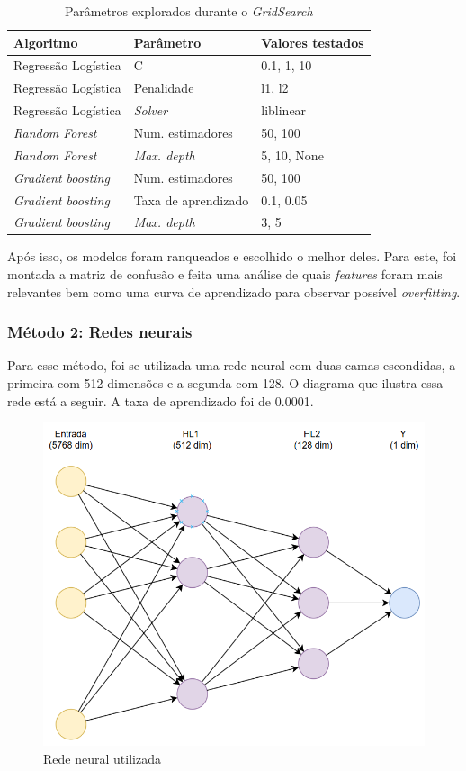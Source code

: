 \documentclass[12pt]{article}
\begin{document}
\begin{table}[H]
	\centering
	\begin{tabular}{|l|l|l|}
		\hline
		Algoritmo & Parâmetro & Valores testados \\
		\hline
		Regressão Logística & C & 0.1, 1, 10  \\
		Regressão Logística & Penalidade & l1, l2 \\ 
		Regressão Logística & \textit{Solver} & liblinear \\ 
		\hline
		\textit{Random Forest} & Num. estimadores & 50, 100 \\
		\textit{Random Forest} & \textit{Max. depth} & 5, 10, None \\
		\hline
		\textit{Gradient boosting} & Num. estimadores & 50, 100\\
		\textit{Gradient boosting} & Taxa de aprendizado & 0.1, 0.05\\
		\textit{Gradient boosting} & \textit{Max. depth} & 3, 5\\
		\hline
	\end{tabular}
	\label{tab:gridsearch}
	\caption{Parâmetros explorados durante o \textit{GridSearch}}
\end{table}

Após isso, os modelos foram ranqueados e escolhido o melhor deles. Para este, foi montada a matriz de confusão e feita uma análise de quais \textit{features} foram mais relevantes bem como uma curva de aprendizado para observar possível \textit{overfitting}.

\subsubsection{Método 2: Redes neurais}

Para esse método, foi-se utilizada uma rede neural com duas camas escondidas, a primeira com 512 dimensões e a segunda com 128. O diagrama que ilustra essa rede está a seguir. A taxa de aprendizado foi de 0.0001.

\begin{figure}[h]
	\centering
	\includegraphics[width=0.6\linewidth]{imagens/rede_neural.png}
	\caption{Rede neural utilizada}
	\label{fig:rede-neural}
\end{figure}
\end{document}
